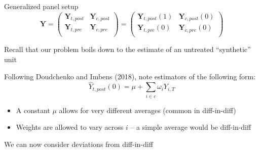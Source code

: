 \documentclass[notes,11pt, aspectratio=169]{beamer}
\newenvironment{wideitemize}{\itemize\addtolength{\itemsep}{10pt}}{\enditemize}
\begin{document}
\begin{frame}{Generalized panel setup}
      \begin{equation*}
        \mathbf{Y} = \left( \begin{array}{cc}
                              \mathbf{Y}_{t,post} & \mathbf{Y}_{c,post} \\
                              \mathbf{Y}_{t,pre} & \mathbf{Y}_{c,pre} \\
                            \end{array}
                            \right) =  \left( \begin{array}{cc}
                              \mathbf{Y}_{t,post}(1) & \mathbf{Y}_{c,post}(0) \\
                              \mathbf{Y}_{t,pre}(0) & \mathbf{Y}_{c,pre}(0) \\
                            \end{array}
                            \right) 
      \end{equation*}
      \begin{wideitemize}
      \item Recall that our problem boils down to the estimate of an untreated ``synthetic'' unit
      \item Following Doudchenko and Imbens (2018), note estimators of the following form:
        \begin{equation*}
          \hat{Y}_{t,post}(0) = \mu + \sum_{i \in c}\omega_{i} Y_{i, T}
        \end{equation*}
        \begin{itemize}
        \item A constant $\mu$ allows for very different averages (common in diff-in-diff)
        \item Weights are allowed to vary across $i$ -- a simple
          average would be diff-in-diff
        \end{itemize}
      \item We can now consider deviations from diff-in-diff
      \end{wideitemize}
\end{frame}
\end{document}
